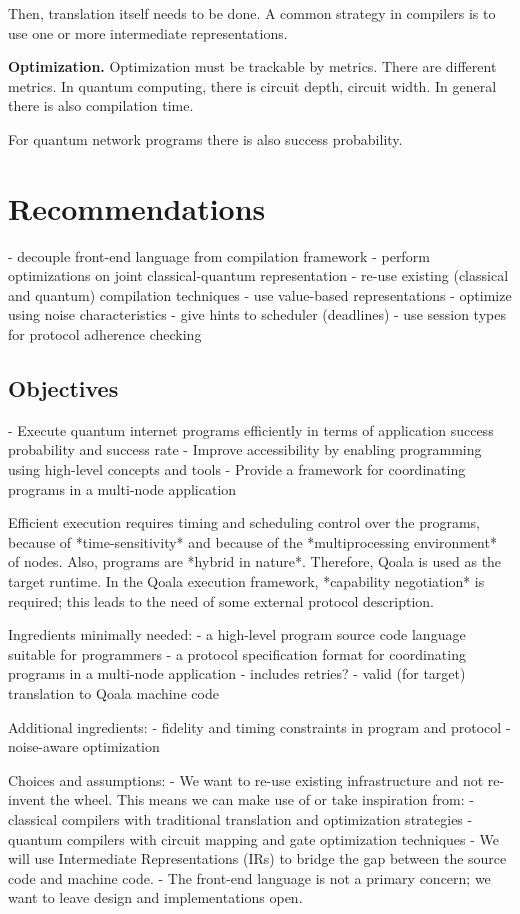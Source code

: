 Then, translation itself needs to be done. 
A common strategy in compilers is to use one or more intermediate representations.

\textbf{Optimization.}
Optimization must be trackable  by metrics.
There are different metrics.
In quantum computing, there is circuit depth, circuit width.
In general there is also compilation time.

For quantum network programs there is also success probability.


\section{Recommendations}
- decouple front-end language from compilation framework
- perform optimizations on joint classical-quantum representation
- re-use existing (classical and quantum) compilation techniques
  - use value-based representations
- optimize using noise characteristics
- give hints to scheduler (deadlines)
- use session types for protocol adherence checking

\subsection{Objectives}
- Execute quantum internet programs efficiently in terms of application success probability and success rate
- Improve accessibility by enabling programming using high-level concepts and tools
- Provide a framework for coordinating programs in a multi-node application

Efficient execution requires timing and scheduling control over the programs, because of *time-sensitivity* and because of the *multiprocessing environment* of nodes.
Also, programs are *hybrid in nature*.
Therefore, Qoala is used as the target runtime.
In the Qoala execution framework, *capability negotiation* is required; this leads to the need of some external protocol description.


Ingredients minimally needed:
- a high-level program source code language suitable for programmers
- a protocol specification format for coordinating programs in a multi-node application
  - includes retries?
- valid (for target) translation to Qoala machine code

Additional ingredients:
- fidelity and timing constraints in program and protocol
- noise-aware optimization


Choices and assumptions:
- We want to re-use existing infrastructure and not re-invent the wheel. This means we can make use of or take inspiration from:
  - classical compilers with traditional translation and optimization strategies
  - quantum compilers with circuit mapping and gate optimization techniques
- We will use Intermediate Representations (IRs) to bridge the gap between the source code and machine code.
- The front-end language is not a primary concern; we want to leave design and implementations open.

